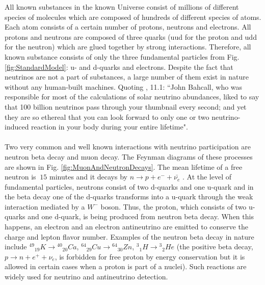 All known substances in the known Universe consist of millions of different species of molecules which are composed of hundreds of different species of atoms. Each atom consists of a certain number of protons, neutrons and electrons. All protons and neutrons are composed of three quarks (uud for the proton and udd for the neutron) which are glued together by strong interactions. Therefore, all known substance consists of only the three fundamental particles from Fig. \ref{fig:StandardModel}: u- and d-quarks and electrons. Despite the fact that neutrinos are not a part of substances, a large number of them exist in nature without any human-built machines. Quoting \cite{ref_Griffiths}, 11.1: ``John Bahcall, who was responsible for most of the calculations of solar neutrino abundances, liked to say that 100 billion neutrinos pass through your thumbnail every second; and yet they are so ethereal that you can look forward to only one or two neutrino-induced reaction in your body during your entire lifetime".\\ \\
Two very common and well known interactions with neutrino participation are neutron beta decay and muon decay. The Feynman diagrams of these processes are shown in Fig. \ref{fig:MuonAndNeutronDecays}. The mean lifetime of a free neutron is $~15$ minutes and it decays by $n \rightarrow p + e^- + \bar{{\nu}_e} $ \cite{ref_PDG}. At the level of fundamental particles, neutrons consist of two d-quarks and one u-quark and in the beta decay one of the d-quarks transforms into a u-quark through the weak interaction mediated by a $W^- $ boson. Thus, the proton, which consists of two u-quarks and one d-quark, is being produced from neutron beta decay. When this happens, an electron and an electron antineutrino are emitted to conserve the charge and lepton flavor number. Examples of the neutron beta decay in nature include ${^{49}}{_{19}}K \rightarrow {^{40}}{_{20}}Ca$, ${^{64}}{_{29}}Cu \rightarrow {^{64}}{_{30}}Zn$, ${^3}{_1}H \rightarrow {^3}{_2}He$ \cite{ref_Griffiths} (the positive beta decay,  $p \rightarrow n + e^+ + {\nu}_e $, is forbidden for free proton by energy conservation but it is allowed in certain cases when a proton is part of a nuclei). Such reactions are widely used for neutrino and antineutrino detection.\\\\
